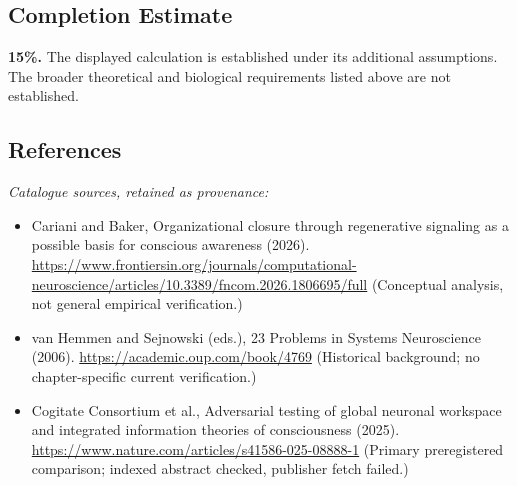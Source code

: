 \documentclass[11pt]{article}
\begin{document}
\subsection{Completion Estimate}
\textbf{15\%.} The displayed calculation is established under its additional assumptions. The broader theoretical and biological requirements listed above are not established.
\subsection{References}
\noindent\emph{Catalogue sources, retained as provenance:}
\begin{itemize}
\item Cariani and Baker, Organizational closure through regenerative signaling as a possible basis for conscious awareness (2026). \url{https://www.frontiersin.org/journals/computational-neuroscience/articles/10.3389/fncom.2026.1806695/full} (Conceptual analysis, not general empirical verification.)
\item van Hemmen and Sejnowski (eds.), 23 Problems in Systems Neuroscience (2006). \url{https://academic.oup.com/book/4769} (Historical background; no chapter-specific current verification.)
\item Cogitate Consortium et al., Adversarial testing of global neuronal workspace and integrated information theories of consciousness (2025). \url{https://www.nature.com/articles/s41586-025-08888-1} (Primary preregistered comparison; indexed abstract checked, publisher fetch failed.)
\end{itemize}
\end{document}
